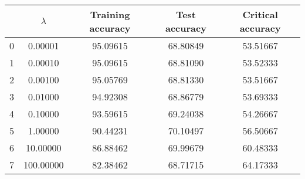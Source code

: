 \begin{tabular}{ccccc}
\hline \hline
{} &  $\lambda$ &  Training accuracy &  Test accuracy &  Critical accuracy \\
\hline \hline
0 &    0.00001 &           95.09615 &       68.80849 &           53.51667 \\
1 &    0.00010 &           95.09615 &       68.81090 &           53.52333 \\
2 &    0.00100 &           95.05769 &       68.81330 &           53.51667 \\
3 &    0.01000 &           94.92308 &       68.86779 &           53.69333 \\
4 &    0.10000 &           93.59615 &       69.24038 &           54.26667 \\
5 &    1.00000 &           90.44231 &       70.10497 &           56.50667 \\
6 &   10.00000 &           86.88462 &       69.99679 &           60.48333 \\
7 &  100.00000 &           82.38462 &       68.71715 &           64.17333 \\
\hline \hline
\end{tabular}
